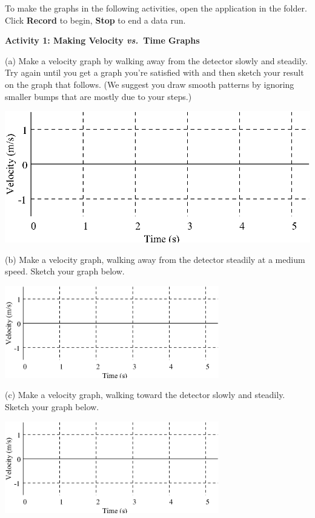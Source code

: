 To make the graphs in the following activities, open the  application in the \filename{\coursefolder} folder. Click \textbf{Record} to begin, \textbf{Stop} to end a data run.

\textbf{Activity 1: Making Velocity \textit{vs.}~Time Graphs} 

(a) Make a velocity graph by walking away from the detector slowly and steadily.
Try again until you get a graph you're satisfied with and then sketch your result
on the graph that follows. (We suggest you draw smooth patterns by ignoring
smaller bumps that are mostly due to your steps.)

\vspace{0.3cm}
{\par\centering \includegraphics{velocity/velocity_fig1.eps} \par}
\vspace{0.3cm}

(b) Make a velocity graph, walking away from the detector steadily at a medium
speed. Sketch your graph below.

\vspace{0.3cm}
{\par\centering \includegraphics[width=0.7\textwidth]{velocity/velocity_fig1.eps} \par}
\vspace{0.3cm}

(c) Make a velocity graph, walking toward the detector slowly and steadily.
Sketch your graph below.

\vspace{0.3cm}
{\par\centering \includegraphics[width=0.7\textwidth]{velocity/velocity_fig1.eps} \par}
\vspace{0.3cm}

